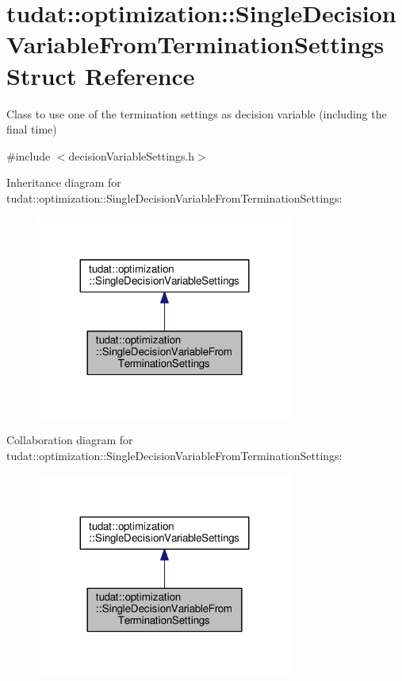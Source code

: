 \hypertarget{structtudat_1_1optimization_1_1SingleDecisionVariableFromTerminationSettings}{}\section{tudat\+:\+:optimization\+:\+:Single\+Decision\+Variable\+From\+Termination\+Settings Struct Reference}
\label{structtudat_1_1optimization_1_1SingleDecisionVariableFromTerminationSettings}


Class to use one of the termination settings as decision variable (including the final time)  




{\ttfamily \#include $<$decision\+Variable\+Settings.\+h$>$}



Inheritance diagram for tudat\+:\+:optimization\+:\+:Single\+Decision\+Variable\+From\+Termination\+Settings\+:
\nopagebreak
\begin{figure}[H]
\begin{center}
\leavevmode
\includegraphics[width=239pt]{structtudat_1_1optimization_1_1SingleDecisionVariableFromTerminationSettings__inherit__graph}
\end{center}
\end{figure}


Collaboration diagram for tudat\+:\+:optimization\+:\+:Single\+Decision\+Variable\+From\+Termination\+Settings\+:
\nopagebreak
\begin{figure}[H]
\begin{center}
\leavevmode
\includegraphics[width=239pt]{structtudat_1_1optimization_1_1SingleDecisionVariableFromTerminationSettings__coll__graph}
\end{center}
\end{figure}
